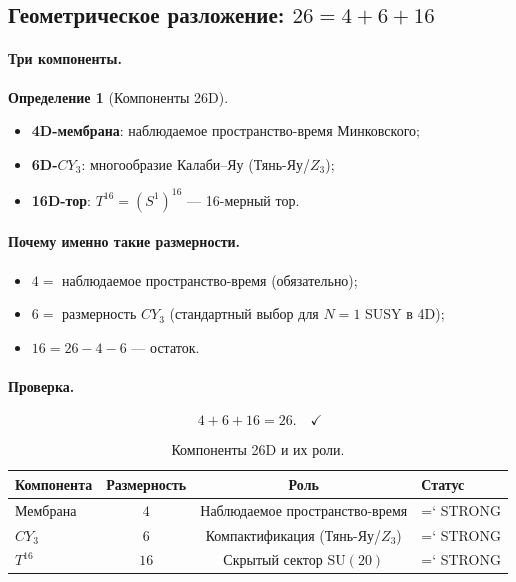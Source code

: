 \documentclass[11pt,a4paper]{article}
\newcommand{\SU}{\mathrm{SU}}
\newcommand{\CY}{CY_3}
\renewcommand{\texttt}[1]{{\ttfamily\hyphenchar\font=`\- #1}}
\theoremstyle{definition}
\newtheorem{definition}[theorem]{Определение}
\begin{document}
\subsection{Геометрическое разложение: $26 = 4 + 6 + 16$}
\label{subsec:geometric-decomposition}

\paragraph{Три компоненты.}

\begin{definition}[Компоненты 26D]
\label{def:26d-components}
\begin{itemize}
    \item \textbf{4D-мембрана}: наблюдаемое пространство-время 
          Минковского;
    \item \textbf{6D-$\CY$}: многообразие Калаби--Яу 
          (Тянь-Яу/$Z_3$);
    \item \textbf{16D-тор}: $T^{16} = (S^1)^{16}$ — 16-мерный тор.
\end{itemize}
\end{definition}

\paragraph{Почему именно такие размерности.}
\begin{itemize}
    \item $4 = $ наблюдаемое пространство-время (обязательно);
    \item $6 = $ размерность $\CY$ (стандартный выбор для 
          $N = 1$ SUSY в 4D);
    \item $16 = 26 - 4 - 6$ — остаток.
\end{itemize}

\paragraph{Проверка.}
\begin{equation}
    4 + 6 + 16 = 26. \quad \checkmark
\end{equation}

\begin{table}[htbp]
\centering
\caption{Компоненты 26D и их роли.}
\label{tab:26d-components}
\begin{tabular}{lccl}
\toprule
Компонента & Размерность & Роль & Статус \\ 
\midrule
Мембрана & $4$ & Наблюдаемое пространство-время & \texttt{STRONG} \\[0.3em]
$\CY$ & $6$ & Компактификация (Тянь-Яу/$Z_3$) & \texttt{STRONG} \\[0.3em]
$T^{16}$ & $16$ & Скрытый сектор $\SU(20)$ & \texttt{STRONG} \\ 
\bottomrule
\end{tabular}
\end{table}
\end{document}
